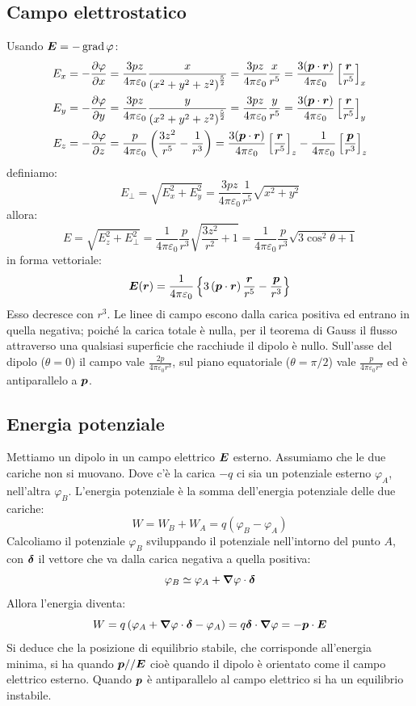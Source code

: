 \subsection{Campo elettrostatico}
Usando $\boldsymbol{E}=-\operatorname{grad}\varphi$:
\begin{align}
  \label{eq:E_dipolo}
  E_x & =-\frac{\partial\varphi}{\partial x}=\frac{3pz}{4\pi\varepsilon_0}\frac{x}{\left(x^2+y^2+z^2\right)^\frac{5}{2}}=\frac{3pz}{4\pi\varepsilon_0}\frac{x}{r^5}=\frac{3(\boldsymbol{p}\cdot \boldsymbol{r})}{4\pi\varepsilon_0}\left[\frac{\boldsymbol{r}}{r^5}\right]_x \\
  E_y & =-\frac{\partial\varphi}{\partial y}=\frac{3pz}{4\pi\varepsilon_0}\frac{y}{\left(x^2+y^2+z^2\right)^\frac{5}{2}}=\frac{3pz}{4\pi\varepsilon_0}\frac{y}{r^5}=\frac{3(\boldsymbol{p}\cdot \boldsymbol{r})}{4\pi\varepsilon_0}\left[\frac{\boldsymbol{r}}{r^5}\right]_y \\
  E_z & =-\frac{\partial\varphi}{\partial z}=\frac{p}{4\pi\varepsilon_0}\left(\frac{3z^2}{r^5}-\frac{1}{r^3}\right)=\frac{3(\boldsymbol{p}\cdot \boldsymbol{r})}{4\pi\varepsilon_0}\left[\frac{\boldsymbol{r}}{r^5}\right]_z-\frac{1}{4\pi\varepsilon_0}\left[\frac{\boldsymbol{p}}{r^3}\right]_z
\end{align}
definiamo:
\[E_\perp=\sqrt{E_x^2+E_y^2}=\frac{3pz}{4\pi\varepsilon_0}\frac{1}{r^{5}}\sqrt{x^2+y^2}\]
allora:
\[E=\sqrt{E_z^2+E_\perp^2}=\frac{1}{4\pi\varepsilon_0}\frac{p}{r^3}\sqrt{\frac{3z^2}{r^2}+1}=\frac{1}{4\pi\varepsilon_0}\frac{p}{r^3}\sqrt{3\cos^2\theta+1}\]
in forma vettoriale:
\begin{equation}
  \label{eq:campo_dipolo}
  \boldsymbol{E}(\boldsymbol{r})=\frac{1}{4\pi\varepsilon_0}\left\{3\left(\boldsymbol{p}\cdot\boldsymbol{r}\right)\frac{\boldsymbol{r}}{r^5}-\frac{\boldsymbol{p}}{r^3}\right\}\end{equation}
Esso decresce con $r^3$. Le linee di campo escono dalla carica positiva ed entrano in quella negativa; poiché la carica totale è nulla, per il teorema di Gauss il flusso attraverso una qualsiasi superficie che racchiude il dipolo è nullo. Sull'asse del dipolo ($\theta=0$) il campo vale $\frac{2p}{4\pi\varepsilon_0r^3}$, sul piano equatoriale ($\theta=\pi/2$) vale $\frac{p}{4\pi\varepsilon_0r^3}$ ed è antiparallelo a $\boldsymbol{p}$.
\subsection{Energia potenziale}
Mettiamo un dipolo in un campo elettrico $\boldsymbol{E}$ esterno. Assumiamo che le due cariche non si muovano. Dove c'è la carica $-q$ ci sia un potenziale esterno $\varphi_A$, nell'altra $\varphi_B$. L'energia potenziale è la somma dell'energia potenziale delle due cariche:
\[W=W_B+W_A=q(\varphi_B-\varphi_A)\]
Calcoliamo il potenziale $\varphi_B$ sviluppando il potenziale nell'intorno del punto $A$, con $\boldsymbol{\delta}$ il vettore che va dalla carica negativa a quella positiva:
\[\varphi_B\simeq\varphi_A+\boldsymbol{\nabla}\varphi\cdot\boldsymbol{\delta}\]
Allora l'energia diventa:
\[W=q\left(\varphi_A+\boldsymbol{\nabla}\varphi\cdot\boldsymbol{\delta}-\varphi_A\right)=q\boldsymbol{\delta}\cdot\boldsymbol{\nabla}\varphi=-\boldsymbol{p}\cdot\boldsymbol{E}\]
Si deduce che la posizione di equilibrio stabile, che corrisponde all'energia minima, si ha quando $\boldsymbol{p}//\boldsymbol{E}$ cioè quando il dipolo è orientato come il campo elettrico esterno. Quando $\boldsymbol{p}$ è antiparallelo al campo elettrico si ha un equilibrio instabile.
